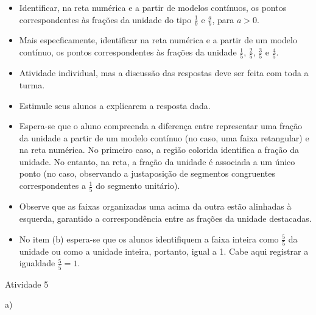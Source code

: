 \documentclass[oneside]{book}
\begin{document}
\begin{multicols}{2}
\begin{itemize} %
    \item       Identificar, na reta numérica e a partir de modelos contínuos, os pontos correspondentes às frações da unidade do tipo       $\frac{1}{b}$       e       $\frac{a}{b}$, para       $a>0$.
    \item       Mais especficamente, identificar na reta numérica e a partir de um modelo contínuo, os pontos correspondentes às frações da unidade       $\frac{1}{5}$,       $\frac{2}{5}$,       $\frac{3}{5}$       e       $\frac{4}{5}$.
\end{itemize} %
  
      
\begin{itemize} %
    \item       Atividade individual, mas a discussão das respostas deve ser feita com toda a turma.
    \item       Estimule seus alunos a explicarem a resposta dada.  
    \item       Espera-se que o aluno compreenda a diferença entre representar uma fração da unidade a partir de um modelo contínuo (no caso, uma faixa retangular) e na reta numérica. No primeiro caso, a região colorida identifica a fração da unidade. No entanto, na reta, a fração da unidade é associada a um único ponto (no caso, observando a justaposição de segmentos congruentes correspondentes a       $\frac{1}{5}$       do segmento unitário). 
    \item       Observe que as faixas organizadas uma acima da outra estão alinhadas à esquerda, garantido a correspondência entre as frações da unidade destacadas. 
    \item       No item (b) espera-se que os alunos identifiquem a faixa inteira como       $\frac{5}{5}$       da unidade ou como a unidade inteira, portanto, igual a 1. Cabe aqui registrar a igualdade       $\frac{5}{5}=1$. 
\end{itemize} %
  

\begin{resposta*}{Atividade 5}

\noindent a)
\begin{center}
\end{center}
\end{resposta*}
\end{multicols}
\end{document}
